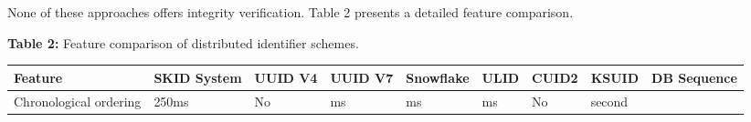 \documentclass[fleqn,10pt]{wlpeerj}
\newcounter{none} %
\begin{document}
None of these approaches offers integrity verification. Table 2 presents
a detailed feature comparison.

\textbf{Table 2:} Feature comparison of distributed identifier schemes.

{\def\LTcaptype{none} %
\begin{longtable}[]{@{}
  >{\raggedright\arraybackslash}p{}
  >{\raggedright\arraybackslash}p{}
  >{\raggedright\arraybackslash}p{}
  >{\raggedright\arraybackslash}p{}
  >{\raggedright\arraybackslash}p{}
  >{\raggedright\arraybackslash}p{}
  >{\raggedright\arraybackslash}p{}
  >{\raggedright\arraybackslash}p{}
  >{\raggedright\arraybackslash}p{}@{}}
\toprule\noalign{}
\begin{minipage}[b]{\linewidth}\raggedright
Feature
\end{minipage} & \begin{minipage}[b]{\linewidth}\raggedright
SKID System
\end{minipage} & \begin{minipage}[b]{\linewidth}\raggedright
UUID V4
\end{minipage} & \begin{minipage}[b]{\linewidth}\raggedright
UUID V7
\end{minipage} & \begin{minipage}[b]{\linewidth}\raggedright
Snowflake
\end{minipage} & \begin{minipage}[b]{\linewidth}\raggedright
ULID
\end{minipage} & \begin{minipage}[b]{\linewidth}\raggedright
CUID2
\end{minipage} & \begin{minipage}[b]{\linewidth}\raggedright
KSUID
\end{minipage} & \begin{minipage}[b]{\linewidth}\raggedright
DB Sequence
\end{minipage} \\
\midrule\noalign{}
\endhead
\bottomrule\noalign{}
\endlastfoot
Chronological ordering & 250ms & No & ms & ms & ms & No & second &

\end{longtable}}
\end{document}
